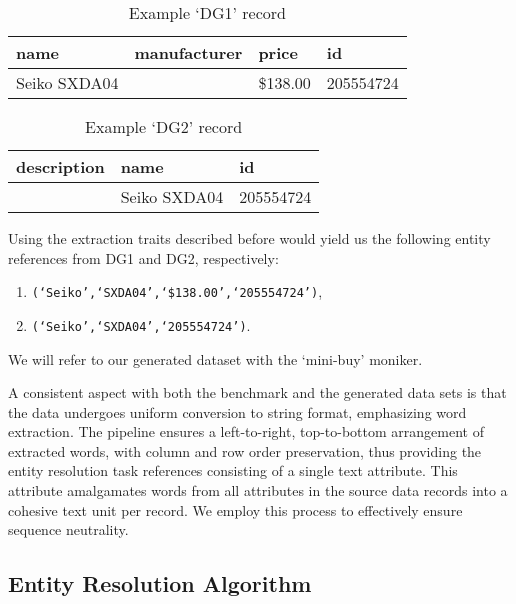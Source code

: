 \begin{table}[ht]
    \setlength\tabcolsep{6pt}
    \centering
    \begin{tabular}{llll}
        \toprule
        name & manufacturer & price & id \\
        \midrule
        Seiko SXDA04 & & \$138.00 & 205554724 \\
        \bottomrule
    \end{tabular}
    \caption{Example `DG1' record}\label{tab:dg1-record}
\end{table}

\begin{table}[ht]
    \setlength\tabcolsep{5pt}
    \centering
    \begin{tabular}[b]{lll}
        \toprule
        description&name&id \\
        \midrule
        &Seiko SXDA04&205554724 \\
        \bottomrule
    \end{tabular}
    \caption{Example `DG2' record}\label{tab:dg2-record}
\end{table}

Using the extraction traits described before would yield us the
following entity references from DG1 and DG2, respectively:
\begin{enumerate}
    \item \texttt{(`Seiko',`SXDA04',`\$138.00',`205554724')},
    \item \texttt{(`Seiko',`SXDA04',`205554724')}.
\end{enumerate}

We will refer to our generated dataset with the `mini-buy' moniker.

A consistent aspect with both the benchmark and the generated data sets is that
the data undergoes uniform conversion to string format, emphasizing word
extraction.
The pipeline ensures a left-to-right, top-to-bottom arrangement of extracted
words, with column and row order preservation, thus providing the entity
resolution task references consisting of a single text attribute.
This attribute amalgamates words from all attributes in the source data records
into a cohesive text unit per record.
We employ this process to effectively ensure sequence neutrality.

\subsection{Entity Resolution Algorithm}\label{subsec:Entity Resolution Algorithm}

